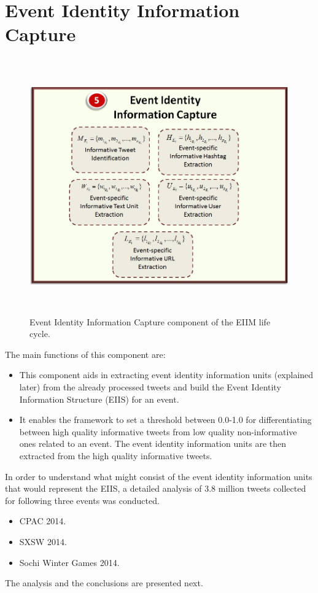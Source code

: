 \section{Event Identity Information Capture\label{infocapture}}

\begin{figure}[htbp]
  \caption{Event Identity Information Capture component of the EIIM life cycle.}
  \centering
    \includegraphics[width=14cm,height=11cm]{Figures/EventIdentityCapture.jpg}
\end{figure}

The main functions of this component are:
\begin{itemize}
\item This component aids in extracting event identity information units (explained later) from the already processed tweets and build the Event Identity Information Structure (EIIS) for an event.
\item It enables the framework to set a threshold between 0.0-1.0 for differentiating between high quality informative tweets from low quality non-informative ones related to an event. The event identity information units are then extracted from the high quality informative tweets.
\end{itemize}
  
In order to understand what might consist of the event identity information units that would represent the EIIS, a detailed analysis of 3.8 million tweets collected for following three events was conducted. 
\begin{itemize}
\item CPAC 2014.
\item SXSW 2014.
\item Sochi Winter Games 2014.
\end{itemize}
The analysis and the conclusions are presented next.

